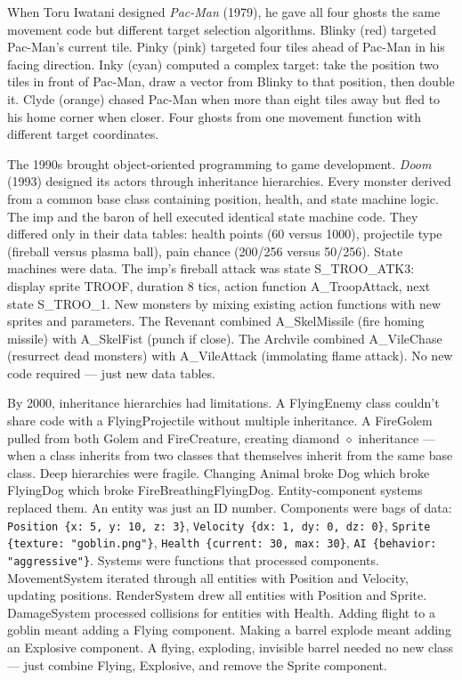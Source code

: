  When Toru Iwatani designed \emph{Pac-Man} (1979), he gave all four ghosts the same movement code but different target selection algorithms. Blinky (red) targeted Pac-Man's current tile. Pinky (pink) targeted four tiles ahead of Pac-Man in his facing direction. Inky (cyan) computed a complex target: take the position two tiles in front of Pac-Man, draw a vector from Blinky to that position, then double it. Clyde (orange) chased Pac-Man when more than eight tiles away but fled to his home corner when closer. Four ghosts from one movement function with different target coordinates.

The 1990s brought object-oriented programming to game development. \emph{Doom} (1993) designed its actors through inheritance hierarchies. Every monster derived from a common base class containing position, health, and state machine logic. The imp and the baron of hell executed identical state machine code. They differed only in their data tables: health points (60 versus 1000), projectile type (fireball versus plasma ball), pain chance (200/256 versus 50/256). State machines were data. The imp's fireball attack was state S\_TROO\_ATK3: display sprite TROOF, duration 8 tics, action function A\_TroopAttack, next state S\_TROO\_1. New monsters by mixing existing action functions with new sprites and parameters. The Revenant combined A\_SkelMissile (fire homing missile) with A\_SkelFist (punch if close). The Archvile combined A\_VileChase (resurrect dead monsters) with A\_VileAttack (immolating flame attack). No new code required — just new data tables.

By 2000, inheritance hierarchies had limitations. A FlyingEnemy class couldn't share code with a FlyingProjectile without multiple inheritance. A FireGolem pulled from both Golem and FireCreature, creating diamond $\diamond$ inheritance — when a class inherits from two classes that themselves inherit from the same base class. Deep hierarchies were fragile. Changing Animal broke Dog which broke FlyingDog which broke FireBreathingFlyingDog. Entity-component systems replaced them. An entity was just an ID number. Components were bags of data: \texttt{Position \{x: 5, y: 10, z: 3\}}, \texttt{Velocity \{dx: 1, dy: 0, dz: 0\}}, \texttt{Sprite \{texture: "goblin.png"\}}, \texttt{Health \{current: 30, max: 30\}}, \texttt{AI \{behavior: "aggressive"\}}. Systems were functions that processed components. MovementSystem iterated through all entities with Position and Velocity, updating positions. RenderSystem drew all entities with Position and Sprite. DamageSystem processed collisions for entities with Health. Adding flight to a goblin meant adding a Flying component. Making a barrel explode meant adding an Explosive component. A flying, exploding, invisible barrel needed no new class — just combine Flying, Explosive, and remove the Sprite component.

